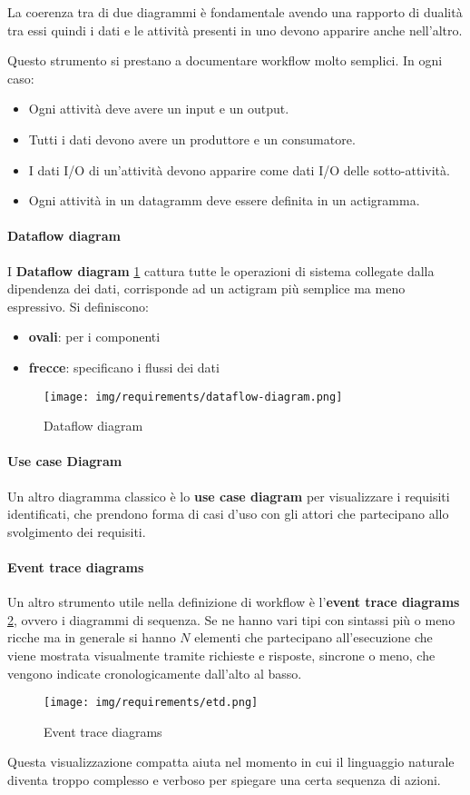 La coerenza tra di due diagrammi è fondamentale avendo una rapporto di dualità
tra essi quindi i dati e le attività presenti in uno devono apparire anche nell'altro.

Questo strumento si prestano a documentare workflow molto semplici. In ogni caso:
\begin{itemize}
      \item Ogni attività deve avere un input e un output.
      \item Tutti i dati devono avere un produttore e un consumatore.
      \item I dati I/O di un'attività devono apparire come dati I/O delle sotto-attività.
      \item Ogni attività in un datagramm deve essere definita in un actigramma.
\end{itemize}
\paragraph{Dataflow diagram}
I \textbf{Dataflow diagram} \ref{fig:dataflow-diagram} cattura tutte le operazioni
di sistema collegate dalla dipendenza dei dati,
corrisponde ad un actigram più semplice ma meno espressivo. Si definiscono:
\begin{itemize}
      \item \textbf{ovali}: per i componenti
      \item \textbf{frecce}: specificano i flussi dei dati
\end{itemize}

\begin{figure}[!ht]
      \centering
      \texttt{[image: img/requirements/dataflow-diagram.png]}
      \caption{Dataflow diagram}
      \label{fig:dataflow-diagram}
\end{figure}

\paragraph{Use case Diagram}
Un altro diagramma classico è lo \textbf{use case diagram} per visualizzare i
requisiti identificati, che prendono forma di casi d'uso con gli attori che partecipano
allo svolgimento dei requisiti.
\paragraph{Event trace diagrams}
Un altro strumento utile nella definizione di workflow è l'\textbf{event trace diagrams}
\ref{fig:etd}, ovvero i diagrammi di sequenza. Se ne hanno vari tipi con sintassi
più o meno ricche ma in generale si hanno $N$ elementi che partecipano all'esecuzione
che viene mostrata visualmente tramite richieste e risposte, sincrone o meno,
che vengono indicate cronologicamente dall'alto al basso.
\begin{figure}[!ht]
      \centering
      \texttt{[image: img/requirements/etd.png]}
      \caption{Event trace diagrams}
      \label{fig:etd}
\end{figure}
Questa visualizzazione compatta aiuta nel momento in cui il linguaggio naturale
diventa troppo complesso e verboso per spiegare una certa sequenza di azioni.
